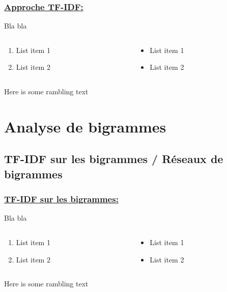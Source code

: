 \documentclass[xcolor=dvipsnames]{beamer}
\begin{document}
	\begin{frame}
		\frametitle{\underline{Approche TF-IDF:}}
		Bla bla 
		\begin{columns}
			\begin{column}{0.5\textwidth} %
				\begin{enumerate}
					\item List item 1
					\item List item 2
				\end{enumerate}
			\end{column}
			\begin{column}{0.5\textwidth}
				\begin{itemize}
					\item List item 1
					\item List item 2
				\end{itemize}
			\end{column}
		\end{columns}
		\vspace{\baselineskip}
		Here is some rambling text
	\end{frame}

	\section*{Analyse de bigrammes}
	\subsection*{TF-IDF sur les bigrammes / Réseaux de bigrammes}

	\begin{frame}
		\frametitle{\underline{TF-IDF sur les bigrammes:}}
		Bla bla 
		\begin{columns}
			\begin{column}{0.5\textwidth} %
				\begin{enumerate}
					\item List item 1
					\item List item 2
				\end{enumerate}
			\end{column}
			\begin{column}{0.5\textwidth}
				\begin{itemize}
					\item List item 1
					\item List item 2
				\end{itemize}
			\end{column}
		\end{columns}
		\vspace{\baselineskip}
		Here is some rambling text
	\end{frame}
\end{document}
